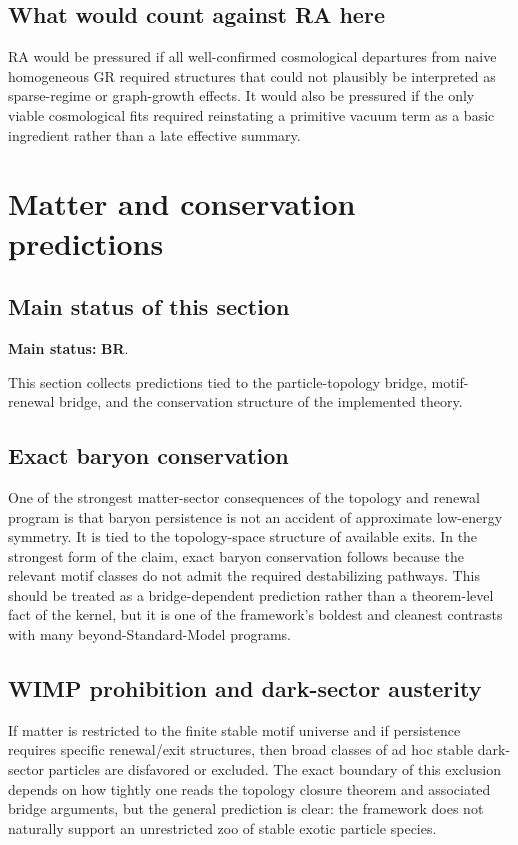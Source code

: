 \documentclass[11pt]{article}
\begin{document}
\subsection{What would count against RA here}
RA would be pressured if all well-confirmed cosmological departures from naive homogeneous GR required structures that could not plausibly be interpreted as sparse-regime or graph-growth effects. It would also be pressured if the only viable cosmological fits required reinstating a primitive vacuum term as a basic ingredient rather than a late effective summary.

\section{Matter and conservation predictions}\label{sec:matter-conservation}
\subsection{Main status of this section}
\textbf{Main status:} \textbf{BR}.

This section collects predictions tied to the particle-topology bridge, motif-renewal bridge, and the conservation structure of the implemented theory.

\subsection{Exact baryon conservation}
One of the strongest matter-sector consequences of the topology and renewal program is that baryon persistence is not an accident of approximate low-energy symmetry. It is tied to the topology-space structure of available exits. In the strongest form of the claim, exact baryon conservation follows because the relevant motif classes do not admit the required destabilizing pathways. This should be treated as a bridge-dependent prediction rather than a theorem-level fact of the kernel, but it is one of the framework's boldest and cleanest contrasts with many beyond-Standard-Model programs.

\subsection{WIMP prohibition and dark-sector austerity}
If matter is restricted to the finite stable motif universe and if persistence requires specific renewal/exit structures, then broad classes of ad hoc stable dark-sector particles are disfavored or excluded. The exact boundary of this exclusion depends on how tightly one reads the topology closure theorem and associated bridge arguments, but the general prediction is clear: the framework does not naturally support an unrestricted zoo of stable exotic particle species.
\end{document}
